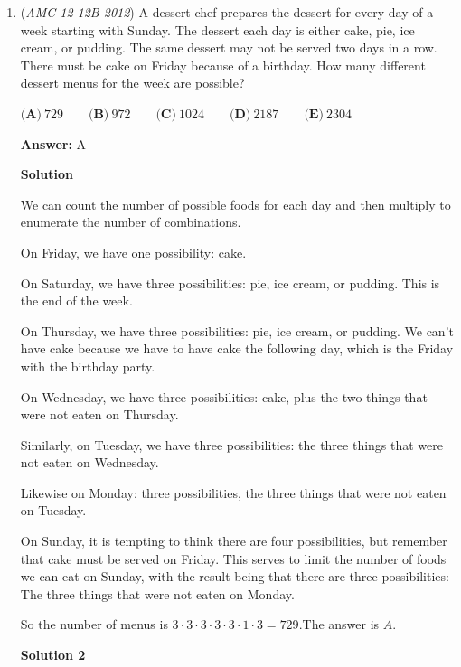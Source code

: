 \begin{enumerate}
 The total amount of red gaps of lights hung is $\frac{21-3}{2} = 9$ gaps. Multiplying $9 * 2.5 = 22.5$ inches. This gives $(E)$.

 


	\item (\textit{AMC 12 12B 2012}) A dessert chef prepares the dessert for every day of a week starting with Sunday. The dessert each day is either cake, pie, ice cream, or pudding. The same dessert may not be served two days in a row. There must be cake on Friday because of a birthday. How many different dessert menus for the week are possible?


 $\textbf{(A)}\ 729\qquad\textbf{(B)}\ 972\qquad\textbf{(C)}\ 1024\qquad\textbf{(D)}\ 2187\qquad\textbf{(E)}\ 2304$

 \textbf{Answer: }A



\textbf{Solution}

We can count the number of possible foods for each day and then multiply to enumerate the number of combinations.

 On Friday, we have one possibility: cake.

 On Saturday, we have three possibilities: pie, ice cream, or pudding. This is the end of the week.

 On Thursday, we have three possibilities: pie, ice cream, or pudding. We can't have cake because we have to have cake the following day, which is the Friday with the birthday party.

 On Wednesday, we have three possibilities: cake, plus the two things that were not eaten on Thursday.

 Similarly, on Tuesday, we have three possibilities: the three things that were not eaten on Wednesday.

 Likewise on Monday: three possibilities, the three things that were not eaten on Tuesday.

 On Sunday, it is tempting to think there are four possibilities, but remember that cake must be served on Friday. This serves to limit the number of foods we can eat on Sunday, with the result being that there are three possibilities: The three things that were not eaten on Monday.

 So the number of menus is $3 \cdot 3 \cdot 3 \cdot 3 \cdot 3 \cdot 1 \cdot 3 = 729.$The answer is $\boxed{A}$.

 



\textbf{Solution 2}


\end{enumerate}
